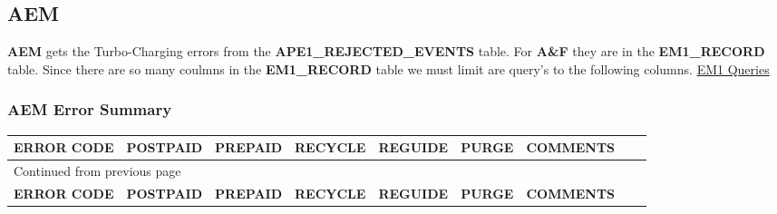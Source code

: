 \documentclass[12pt,twoside]{article}
\begin{document}
\subsection{AEM}
\label{sec:orgheadline7}
\textbf{AEM} gets the Turbo-Charging errors from the
\textbf{APE1\_REJECTED\_EVENTS} table. For \textbf{A\&F} they are in the
\textbf{EM1\_RECORD} table. Since there are so many coulmns in the
\textbf{EM1\_RECORD} table we must limit are query's to the following
columns. \href{docs/EM1\%20Query's}{EM1 Queries}
\newpage 
\begin{landscape}  
\subsubsection{AEM Error Summary}
\label{sec:orgheadline6}
\scriptsize
\begin{longtable}{l|l|l|l|l|l|l|l|l}
\hline
\textbf{ERROR CODE} & \textbf{POSTPAID} & \textbf{PREPAID} & \textbf{RECYCLE} & \textbf{REGUIDE} & \textbf{PURGE} & \textbf{COMMENTS}\\
\hline
\endfirsthead
\multicolumn{7}{l}{Continued from previous page} \\
\hline

\textbf{ERROR CODE} & \textbf{POSTPAID} & \textbf{PREPAID} & \textbf{RECYCLE} & \textbf{REGUIDE} & \textbf{PURGE} & \textbf{COMMENTS} \\


\end{longtable}
\end{landscape}
\end{document}
